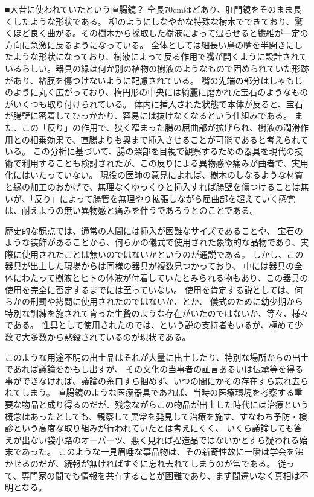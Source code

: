 ■大昔に使われていたという直腸鏡？
全長70cmほどあり、肛門鏡をそのまま長くしたような形状である。
柳のようにしなやかな特殊な樹木でできており、驚くほど良く曲がる。その樹木から採取した樹液によって湿らせると繊維が一定の方向に急激に反るようになっている。
全体としては細長い鳥の嘴を半開きにしたような形状になっており、樹液によって反る作用で嘴が開くように設計されているらしい。器具の縁は何か別の植物の樹液のようなもので固められていた形跡があり、粘膜を傷つけないように配慮されている。
嘴の先端の部分はしゃもじのように丸く広がっており、楕円形の中央には綺麗に磨かれた宝石のようなものがいくつも取り付けられている。
体内に挿入された状態で本体が反ると、宝石が腸壁に密着してひっかかり、容易には抜けなくなるという仕組みである。
また、この「反り」の作用で、狭く窄まった腸の屈曲部が拡げられ、樹液の潤滑作用との相乗効果で、直腸よりも奥まで挿入させることが可能であると考えられている。
この分析に基づいて、腸の深部を目視で観察するための器具を現代の技術で利用することも検討されたが、この反りによる異物感や痛みが曲者で、実用化にはいたっていない。
現役の医師の意見によれば、樹木のしなるような材質と縁の加工のおかげで、無理なくゆっくりと挿入すれば腸壁を傷つけることは無いが、「反り」によって腸管を無理やり拡張しながら屈曲部を超えていく感覚は、耐えようの無い異物感と痛みを伴うであろうとのことである。

歴史的な観点では、通常の人間には挿入が困難なサイズであることや、
宝石のような装飾があることから、何らかの儀式で使用された象徴的な品物であり、実際に使用されたことは無いのではないかというのが通説である。
しかし、この器具が出土した現場からは同様の器具が複数見つかっており、
中には器具の全体にわたって樹液とヒトの体液が付着していたとみられる物もあり、この器具の使用を完全に否定するまでには至っていない。
使用を肯定する説としては、何らかの刑罰や拷問に使用されたのではないか、とか、
儀式のために幼少期から特別な訓練を施されて育った生贄のような存在がいたのではないか、等々、様々である。
性具として使用されたのでは、という説の支持者もいるが、極めて少数で大多数から黙殺されているのが現状である。

このような用途不明の出土品はそれが大量に出土したり、特別な場所からの出土であれば議論をかもし出すが、
その文化の当事者の証言あるいは伝承等を得る事ができなければ、議論の糸口すら掴めず、いつの間にかその存在すら忘れ去られてしまう。
直腸鏡のような医療器具であれば、当時の医療環境を考察する重要な物品と成り得るのだが、残念ながらこの物品が出土した時代には治療という概念はあったとしても、観察して異常を発見して治療を施す、すなわち予防・検診という高度な取り組みが行われていたとは考えにくく、
いくら議論しても答えが出ない袋小路のオーパーツ、悪く見れば捏造品ではないかとすら疑われる始末であった。
このような一見眉唾な事品物は、その新奇性故に一瞬は学会を沸かせるのだが、続報が無ければすぐに忘れ去れてしまうのが常である。
従って、専門家の間でも情報を共有することが困難であり、まず間違いなく真相は不明となる。

